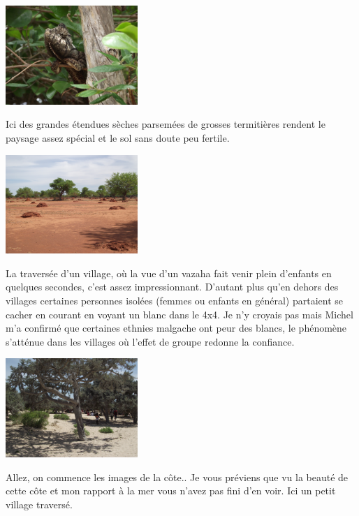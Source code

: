 \begin{multicols}{2}
\smallbreak
\hspace*{-0.65cm}
\includegraphics[width=5cm]{articles/Chemins-du-sud/DSCF0291.JPG}
\smallbreak

Ici des grandes étendues sèches parsemées de grosses termitières rendent le paysage assez spécial et le sol sans doute peu fertile.

\smallbreak\smallbreak
\hspace*{-0.65cm}
\includegraphics[width=5cm]{articles/Chemins-du-sud/DSCF0299.JPG}
\smallbreak

La traversée d'un village, où la vue d'un vazaha fait venir plein d'enfants en quelques secondes, c'est assez impressionnant. D'autant plus qu'en dehors des villages certaines personnes isolées (femmes ou enfants en général) partaient se cacher en courant en voyant un blanc dans le 4x4. Je n'y croyais pas mais Michel m'a confirmé que certaines ethnies malgache ont peur des blancs, le phénomène s'atténue dans les villages où l'effet de groupe redonne la confiance.

\smallbreak\smallbreak
\hspace*{-0.65cm}
\includegraphics[width=5cm]{articles/Chemins-du-sud/DSCF0303.JPG}
\smallbreak

Allez, on commence les images de la côte.. Je vous préviens que vu la beauté de cette côte et mon rapport à la mer vous n'avez pas fini d'en voir. Ici un petit village traversé.


\end{multicols}
